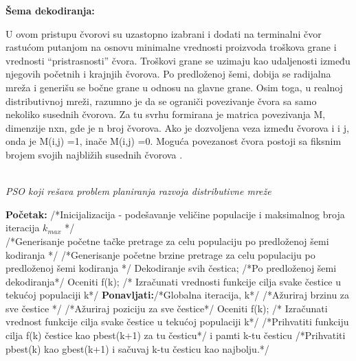 \documentclass[a4paper]{article}
\begin{document}
\begin{flushleft}
\textbf{Šema dekodiranja:} 
\end{flushleft}

U ovom pristupu čvorovi su uzastopno izabrani i dodati na terminalni čvor rastućom putanjom na osnovu minimalne vrednosti proizvoda troškova grane i vrednosti “pristrasnosti” čvora. Troškovi grane se uzimaju kao udaljenosti između njegovih početnih i krajnjih čvorova. Po predloženoj šemi, dobija se radijalna mreža i generišu se bočne grane u odnosu na glavne grane. Osim toga, u realnoj distributivnoj mreži, razumno je da se ograniči povezivanje čvora sa samo nekoliko susednih čvorova. Za tu svrhu formirana je matrica povezivanja M, dimenzije nxn, gde je n broj čvorova. Ako je dozvoljena veza između čvorova i i j, onda je M(i,j) =1, inače  M(i,j) =0. Moguća povezanost čvora postoji sa fiksnim brojem svojih najbližih susednih čvorova \cite{inproceedings}.\\
\\ 


\begin{algorithm}
\small
\caption{\textit{PSO koji rešava problem planiranja razvoja distributivne mreže} }
\label{alg:PSO_distribmreze}  
\begin{algorithmic} 
\STATE \textbf{Početak:} /*Inicijalizacija - podešavanje veličine populacije i maksimalnog broja iteracija $k_{max}$ */ \\
 /*Generisanje početne tačke pretrage za celu populaciju po predloženoj šemi kodiranja */
 /*Generisanje početne brzine pretrage za celu populaciju po predloženoj šemi kodiranja */
\STATE Dekodiranje svih čestica; /*Po predloženoj šemi dekodiranja*/ 
\STATE Oceniti f(k); /* Izračunati vrednosti funkcije cilja svake čestice u tekućoj populaciji k*/
\STATE \textbf{Ponavljati:}/*Globalna iteracija, k*/ 
 /*Ažuriraj brzinu za sve čestice */
 /*Ažuriraj poziciju za sve čestice*/
\STATE Oceniti f(k); /* Izračunati vrednost funkcije cilja svake čestice u tekućoj populaciji k*/
             /*Prihvatiti funkciju cilja f(k) čestice kao pbest(k+1) za tu česticu*/
\ENDIF
{}
             i pamti k-tu česticu /*Prihvatiti pbest(k) kao gbest(k+1) i sačuvaj k-tu česticu kao najbolju.*/
\ENDIF
{} 
\end{algorithmic} 
\end{algorithm} 
\end{document}
